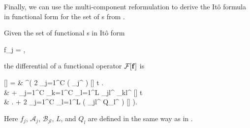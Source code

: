 Finally, we can use the multi-component reformulation to derive the It\^{o} formula in functional form for the set of s from .

\begin{theorem}
\label{thm:fpe-sde:ito-formula:func-ito-f}
	Given the set of functional s in It\^{o} form
	\begin{eqn*}
		\upd f_j =  \left[
			\mathcal{A}_j \upd t + \sum_{l=1}^L \mathcal{B}_{jl} \upd Q_l
		\right],
	\end{eqn*}
	the differential of a functional operator $\mathcal{F}[\mathbf{f}]$ is
	\begin{eqn*}
		\upd {}[\fvec]
		={} & \int \upd\xvec^\prime \left(
			2 \sum_{j=1}^C \Real \left(
				_j^\prime \frac{\fdelta}{\fdelta f_j^\prime}
			\right) [\fvec] \upd t \right. \\
		& + \sum_{j=1}^C \sum_{k=1}^C \sum_{l=1}^L
				_{jl}^\prime
				_{kl}^{\prime *}
				\frac{\fdelta}{\fdelta f_j^\prime}
				 [\fvec] \upd t \\
		& \left. + 2 \sum_{j=1}^C \sum_{l=1}^L
			\Real \left(
				_{jl}^\prime
				\upd Q_l^\prime
				\frac{\fdelta}{\fdelta f_j^\prime}
			\right)
			\mathcal{F}[\fvec]
		\right).
	\end{eqn*}
	Here $f_j$, $\mathcal{A}_j$, $\mathcal{B}_{jl}$, $L$, and $Q_l$ are defined in the same way as in .
\end{theorem}

